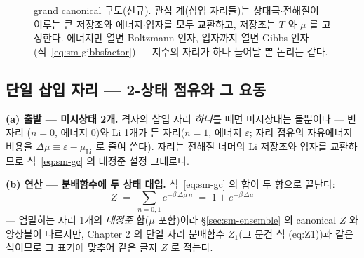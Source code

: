 \documentclass[11pt,a4paper]{article}
\begin{document}
\begin{figure}[t]
\centering
{}
\caption{grand canonical 구도(신규). 관심 계(삽입 자리들)는 상대극$\cdot$전해질이 이루는 큰 저장조와
에너지$\cdot$입자를 모두 교환하고, 저장조는 $T$ 와 $\mu$ 를 고정한다. 에너지만 열면 Boltzmann 인자, 입자까지
열면 Gibbs 인자(식~\eqref{eq:sm-gibbsfactor}) --- 지수의 자리가 하나 늘어날 뿐 논리는 같다.}
\label{fig:sm-reservoir}
\end{figure}

\subsection{단일 삽입 자리 --- 2-상태 점유와 그 요동}\label{sec:sm-site}
\textbf{(a) 출발 --- 미시상태 2개.} 격자의 삽입 자리 \emph{하나}를 떼면 미시상태는 둘뿐이다 --- 빈 자리
($n=0$, 에너지 $0$)와 Li 1개가 든 자리($n=1$, 에너지 $\varepsilon$; 자리 점유의 자유에너지 비용을
$\Delta\mu\equiv\varepsilon-\mu_\mathrm{Li}$ 로 줄여 쓴다). 자리는 전해질 너머의 Li 저장조와 입자를
교환하므로 식~\eqref{eq:sm-gc} 의 대정준 설정 그대로다.

\textbf{(b) 연산 --- 분배함수에 두 상태 대입.} 식~\eqref{eq:sm-gc} 의 합이 두 항으로 끝난다:
\begin{equation}
Z\;=\;\sum_{n=0,1}e^{-\beta\,\Delta\mu\,n}\;=\;1+e^{-\beta\,\Delta\mu}
\label{eq:partfn}
\end{equation}
--- 엄밀히는 자리 1개의 \emph{대정준} 합($\mu$ 포함)이라 \S\ref{sec:sm-ensemble} 의 canonical $Z$ 와 앙상블이
다르지만, Chapter 2 의 단일 자리 분배함수 $Z_1$(그 문건 식 (eq:Z1))과 같은 식이므로 그 표기에 맞추어 같은 글자
$Z$ 로 적는다.
\end{document}
